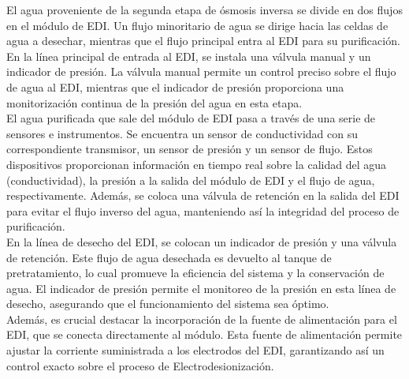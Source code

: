 El agua proveniente de la segunda etapa de ósmosis inversa se divide en dos flujos en el módulo de
EDI. Un flujo minoritario de agua se dirige hacia las celdas de agua a desechar, mientras que el flujo principal entra al EDI para su purificación.\\

En la línea principal de entrada al EDI, se instala una válvula manual y un indicador de presión. La válvula manual permite un control preciso sobre el flujo de agua al EDI, mientras que el indicador de presión proporciona una monitorización continua de la presión del agua en esta etapa.\\

El agua purificada que sale del módulo de EDI pasa a través de una serie de sensores e instrumentos. Se encuentra un sensor de conductividad con su correspondiente transmisor, un sensor de presión y un sensor de flujo. Estos dispositivos proporcionan información en tiempo real sobre la calidad del agua (conductividad), la presión a la salida del módulo de EDI y el flujo de agua, respectivamente. Además, se coloca una válvula de retención en la salida del EDI para evitar el flujo inverso del agua, manteniendo así la integridad del proceso de purificación.\\

En la línea de desecho del EDI, se colocan un indicador de presión y una válvula de retención. Este flujo de agua desechada es devuelto al tanque de pretratamiento, lo cual promueve la eficiencia del sistema y la conservación de agua. El indicador de presión permite el monitoreo de la presión en esta línea de desecho, asegurando que el funcionamiento del sistema sea óptimo.\\

Además, es crucial destacar la incorporación de la fuente de alimentación para el EDI, que se conecta directamente al módulo. Esta fuente de alimentación permite ajustar la corriente suministrada a los electrodos del EDI, garantizando así un control exacto sobre el proceso de Electrodesionización.\\

